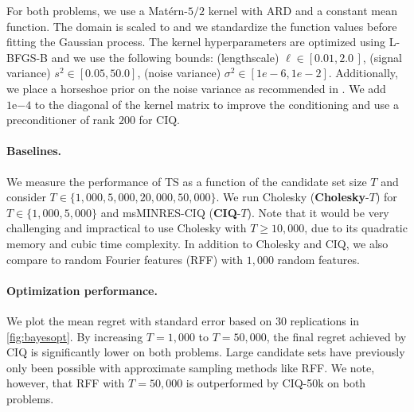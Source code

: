 For both problems, we use a Mat\'ern-$5/2$ kernel with ARD and a constant mean function.
The domain is scaled to  and we standardize the function values before fitting the Gaussian process.
The kernel hyperparameters are optimized using L-BFGS-B and we use the following bounds: (lengthscale) $\ell \in [0.01, 2.0\,]$, (signal variance) $s^2 \in [0.05, 50.0]$, (noise variance) $\sigma^2 \in [1e-6, 1e-2]$.
Additionally, we place a horseshoe prior on the noise variance as recommended in \cite{snoek2012practical}.
We add $1\mathrm{e}{-4}$ to the diagonal of the kernel matrix to improve the conditioning and use a preconditioner of rank $200$ for CIQ.


\paragraph{Baselines.}
We measure the performance of TS as a function of the candidate set size $T$ and consider $T \in \{ 1,\!000, 5,\!000, 20,\!000, 50,\!000 \}$.
We run Cholesky ({\bf Cholesky}-$T$) for  $T \in \{ 1,\!000, 5,\!000\}$ and msMINRES-CIQ ({\bf CIQ}-$T$).
Note that it would be very challenging and impractical to use Cholesky with $T \geq 10,\!000$, due to its quadratic memory and cubic time complexity.
In addition to Cholesky and CIQ, we also compare to random Fourier features (RFF) \cite{rahimi2008random} with $1,\!000$ random features.

\paragraph{Optimization performance.}
We plot the mean regret with standard error based on 30 replications in \cref{fig:bayesopt}.
By increasing $T=1,\!000$ to $T=50,\!000$, the final regret achieved by CIQ is significantly lower on both problems.
Large candidate sets have previously only been possible with approximate sampling methods like RFF.
We note, however, that RFF with $T=50,\!000$ is outperformed by CIQ-50k on both problems.
